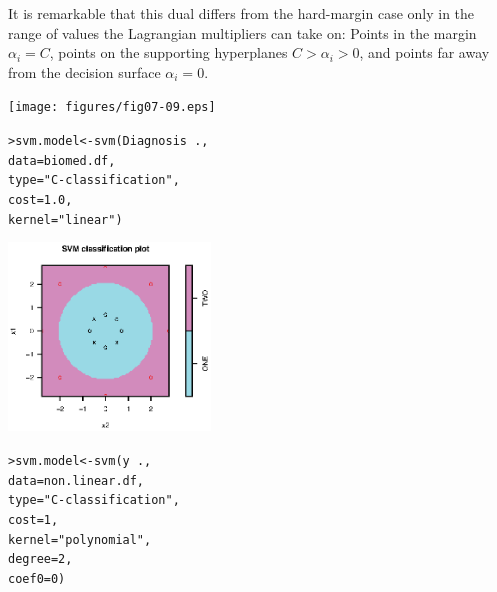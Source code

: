 \documentclass[a4paper,blends,pdf,colorBG,slideColor]{prosper}
\begin{document}
\small
{}

\vspace{.2in}
It is remarkable that this dual differs from the hard-margin case only in the range of values the
Lagrangian multipliers can take on: Points in the margin $\alpha_i = C$, points on the supporting
hyperplanes $C > \alpha_i > 0$, and points far away from the decision surface $\alpha_i = 0$.
\es

\scriptsize
\begin{center}
\texttt{[image: figures/fig07-09.eps]}
\end{center}
\begin{alltt}
> svm.model <- svm(Diagnosis~.,
                   data=biomed.df,
                   type="C-classification",
                   cost=1.0,
                   kernel="linear")
\end{alltt}
\es

\scriptsize
\begin{center}
\includegraphics[height=50mm]{figures/fig07-10.eps}
\end{center}
\begin{alltt}
> svm.model <- svm(y~.,
                   data=non.linear.df,
                   type="C-classification",
                   cost=1,
                   kernel="polynomial",
                   degree=2,
                   coef0=0)
\end{alltt}
\es
\end{document}
